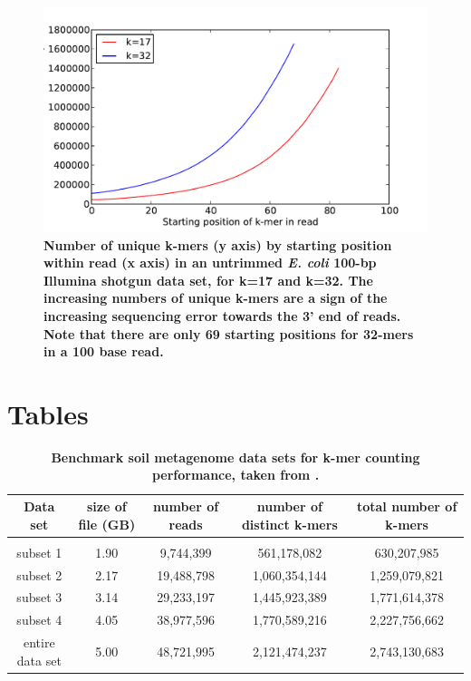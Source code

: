 \documentclass[10pt]{article}
\begin{document}
\begin{figure}[!ht]
\centerline{\includegraphics[width=5in]{./figure/perc_unique_pos}}
\caption{\bf Number of unique k-mers (y axis) by starting position within read (x axis) in 
an untrimmed {\em E. coli} 100-bp Illumina shotgun data set, for k=17 and k=32.  The 
increasing numbers of unique k-mers are a sign of the increasing sequencing error 
towards the 3' end of reads.  Note that there are only 69 starting positions for 32-mers 
in a 100 base read.}
\label{fig:perc_unique_pos}
\end{figure}

\clearpage
\section*{Tables}

\begin{table}[!ht]
\caption{
\bf{Benchmark soil metagenome data sets for k-mer counting performance, taken from
\cite{Howe2012}.}}
\begin{tabular}{ |c | c |c| c|c| }
Data set & size of file (GB) & number of reads & number of distinct
k-mers & total number of k-mers \\
\hline \\
subset 1        & 1.90 &  9,744,399 &   561,178,082 &   630,207,985 \\
subset 2        & 2.17 & 19,488,798 & 1,060,354,144 & 1,259,079,821 \\
subset 3        & 3.14 & 29,233,197 & 1,445,923,389 & 1,771,614,378 \\
subset 4        & 4.05 & 38,977,596 & 1,770,589,216 & 2,227,756,662 \\
entire data set & 5.00 & 48,721,995 & 2,121,474,237 & 2,743,130,683 \\
\end{tabular}
\begin{flushleft}
\end{flushleft}
\label{table:datasets}
\end{table}
\end{document}
